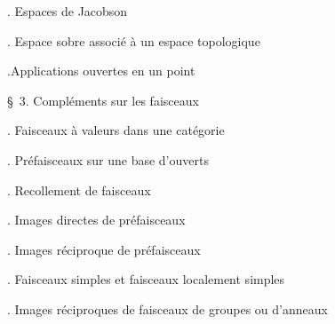 \noindent{}. Espaces de Jacobson\dotfill

\noindent{}. Espace sobre associé à un espace topologique\dotfill

\noindent{}.Applications ouvertes en un point \dotfill

\noindent\quad \S\ 3. Compléments sur les faisceaux\dotfill

\noindent{}. Faisceaux à valeurs dans une catégorie\dotfill

\noindent{}. Préfaisceaux sur une base d'ouverts\dotfill

\noindent{}. Recollement de faisceaux\dotfill

\noindent{}. Images directes de préfaisceaux\dotfill

\noindent{}. Images réciproque de préfaisceaux\dotfill

\noindent{}. Faisceaux simples et faisceaux localement simples\dotfill

\noindent{}. Images réciproques de faisceaux de groupes ou d'anneaux\dotfill

